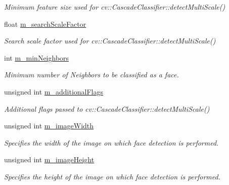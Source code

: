 \begin{DoxyCompactItemize}
\begin{DoxyCompactList}\small\item\em Minimum feature size used for cv\-::\-Cascade\-Classifier\-::detect\-Multi\-Scale() \end{DoxyCompactList}\item 
\hypertarget{class_face_tracker_adb6ffd8a79a458cb701b39616e89e593}{float \hyperlink{class_face_tracker_adb6ffd8a79a458cb701b39616e89e593}{m\-\_\-search\-Scale\-Factor}}\label{class_face_tracker_adb6ffd8a79a458cb701b39616e89e593}

\begin{DoxyCompactList}\small\item\em Search scale factor used for cv\-::\-Cascade\-Classifier\-::detect\-Multi\-Scale() \end{DoxyCompactList}\item 
\hypertarget{class_face_tracker_a939f87b9f2cb592530ed10007f260ea0}{int \hyperlink{class_face_tracker_a939f87b9f2cb592530ed10007f260ea0}{m\-\_\-min\-Neighbors}}\label{class_face_tracker_a939f87b9f2cb592530ed10007f260ea0}

\begin{DoxyCompactList}\small\item\em Minimum number of Neighbors to be classified as a face. \end{DoxyCompactList}\item 
\hypertarget{class_face_tracker_a20e60ee13a0d72915c5cd911fb551b25}{unsigned int \hyperlink{class_face_tracker_a20e60ee13a0d72915c5cd911fb551b25}{m\-\_\-additional\-Flags}}\label{class_face_tracker_a20e60ee13a0d72915c5cd911fb551b25}

\begin{DoxyCompactList}\small\item\em Additional flags passed to cv\-::\-Cascade\-Classifier\-::detect\-Multi\-Scale() \end{DoxyCompactList}\item 
\hypertarget{class_face_tracker_a20746a9ea5b6c90677fc776120b761d1}{unsigned int \hyperlink{class_face_tracker_a20746a9ea5b6c90677fc776120b761d1}{m\-\_\-image\-Width}}\label{class_face_tracker_a20746a9ea5b6c90677fc776120b761d1}

\begin{DoxyCompactList}\small\item\em Specifies the width of the image on which face detection is performed. \end{DoxyCompactList}\item 
\hypertarget{class_face_tracker_a2e35b6c5399c821e2c2ae5f4403f8c43}{unsigned int \hyperlink{class_face_tracker_a2e35b6c5399c821e2c2ae5f4403f8c43}{m\-\_\-image\-Height}}\label{class_face_tracker_a2e35b6c5399c821e2c2ae5f4403f8c43}

\begin{DoxyCompactList}\small\item\em Specifies the height of the image on which face detection is performed. \end{DoxyCompactList}\end{DoxyCompactItemize}
